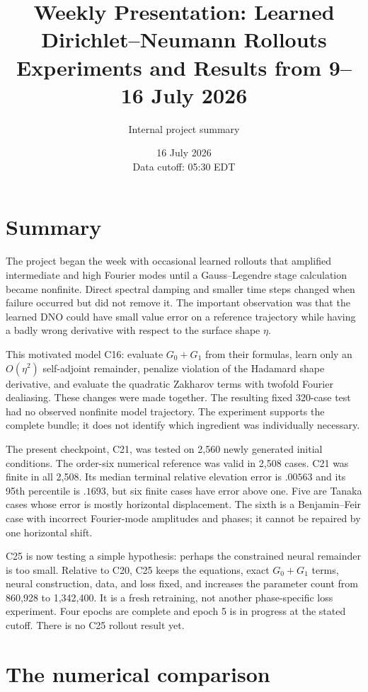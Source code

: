 \documentclass[11pt]{article}
\title{Weekly Presentation: Learned Dirichlet--Neumann Rollouts\\
Experiments and Results from 9--16 July 2026}
\author{Internal project summary}
\date{16 July 2026\\Data cutoff: 05:30 EDT}
\begin{document}
\maketitle

\section*{Summary}

The project began the week with occasional learned rollouts that amplified
intermediate and high Fourier modes until a Gauss--Legendre stage calculation
became nonfinite.  Direct spectral damping and smaller time steps changed when
failure occurred but did not remove it.  The important observation was that
the learned DNO could have small value error on a reference trajectory while
having a badly wrong derivative with respect to the surface shape $\eta$.

This motivated model C16: evaluate $G_0+G_1$ from their formulas, learn only an
$O(\eta^2)$ self-adjoint remainder, penalize violation of the Hadamard shape
derivative, and evaluate the quadratic Zakharov terms with twofold Fourier
dealiasing.  These changes were made together.  The resulting fixed 320-case
test had no observed nonfinite model trajectory.  The experiment supports the
complete bundle; it does not identify which ingredient was individually
necessary.

The present checkpoint, C21, was tested on 2,560 newly generated initial
conditions.  The order-six numerical reference was valid in 2,508 cases.  C21
was finite in all 2,508.  Its median terminal relative elevation error is
$.00563$ and its 95th percentile is $.1693$, but six finite cases have error
above one.  Five are Tanaka cases whose error is mostly horizontal displacement.
The sixth is a Benjamin--Feir case with incorrect Fourier-mode amplitudes and
phases; it cannot be repaired by one horizontal shift.

C25 is now testing a simple hypothesis: perhaps the constrained neural
remainder is too small.  Relative to C20, C25 keeps the equations, exact
$G_0+G_1$ terms, neural construction, data, and loss fixed, and increases the
parameter count from 860,928 to 1,342,400.  It is a fresh retraining, not
another phase-specific loss experiment.  Four epochs are complete and epoch 5
is in progress at the stated cutoff.  There is no C25 rollout result yet.

\section{The numerical comparison}
\end{document}
